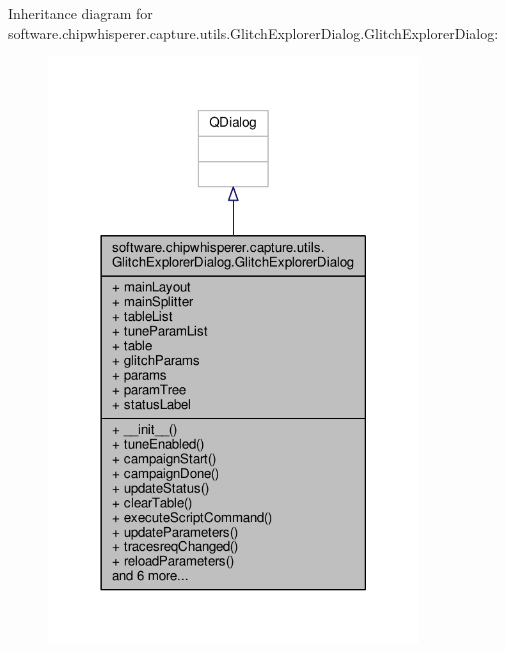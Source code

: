 Inheritance diagram for software.\+chipwhisperer.\+capture.\+utils.\+Glitch\+Explorer\+Dialog.\+Glitch\+Explorer\+Dialog\+:\nopagebreak
\begin{figure}[H]
\begin{center}
\leavevmode
\includegraphics[width=278pt]{d0/dba/classsoftware_1_1chipwhisperer_1_1capture_1_1utils_1_1GlitchExplorerDialog_1_1GlitchExplorerDialog__inherit__graph}
\end{center}
\end{figure}


